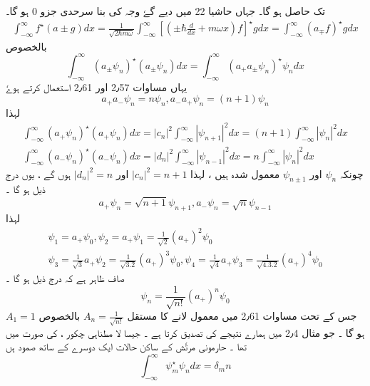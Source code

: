 تک حاصل ہو گا۔  جہاں حاشیا 22 میں دیے گےٗ  وجہ کی بنا سرحدی جزو 0 ہو گا۔
\begin{align}
\int_{ - \infty }^{ \infty } f^\star( a \pm g) dx = \frac{1}{ \sqrt{ 2 \hbar m \omega } } \int_{ - \infty }^{ \infty } [ ( \pm \hbar \frac{d}{dx} + m \omega x ) f]^\star g dx = \int_{ - \infty }^{ \infty } (a_\mp f )^\star g dx
\end{align}  
بالخصوص 
$$ \int_{ - \infty }^{ \infty } ( a_\pm \psi_n )^\star( a_\pm \psi_n ) dx = \int_{ - \infty }^{ \infty } ( a_+ a_\pm \psi_n )^\star \psi_n  dx $$
یہاں مساوات 2٫57 اور 2٫61 استعمال کرتے ہوےٗ 
\begin{equation}
a_+ a_-  \psi_n = n \psi_n , a_- a_+ \psi_n = ( n+1 ) \psi_n 
\end{equation}
لہذا 
\begin{align}
\int_{ - \infty }^{ \infty } ( a_+ \psi_n )^\star( a_+ \psi_n ) dx = | c_n |^2 \int_{ - \infty }^{ \infty } | \psi_{n+1} |^2  dx  = ( n+1 ) \int_{ - \infty }^{ \infty } | \psi_n |^2 dx
\\
\int_{ - \infty }^{ \infty } ( a_- \psi_n )^\star( a_- \psi_n ) dx = | d_n |^2 \int_{ - \infty }^{ \infty } | \psi_{n-1} |^2  dx  =  n \int_{ - \infty }^{ \infty } | \psi_n |^2 dx
\end{align}
چونکہ 
$ \psi_n $
اور 
$ \psi_{ n \pm 1 } $
معمول شدہ ہیں ، لہذا 
$ | c_n |^2 = n+1 $
اور
$ | d_n |^2 = n $
ہوں گے ، یوں درج ذیل ہو گا ۔
\begin{equation}
a_+ \psi_n = \sqrt{n+1} \psi_{n+1} , a_- \psi_n = \sqrt{n} \psi_{n-1}
\end{equation}
لہذا 
\begin{align}
\psi_1 = a_+ \psi_0 , \psi_2 = a_+ \psi_1 = \frac{1}{ \sqrt{ 2 } } (a_+)^2 \psi_0
\\
\psi_3 = \frac{ 1 }{ \sqrt{ 3 } } a_+ \psi_2 = \frac{ 1 }{ \sqrt{3 . 2} } ( a_+ )^3 \psi_0 ,  \psi_4 = \frac{1}{ \sqrt{4} } a_+ \psi_3 =\frac{1}{ \sqrt{4 . 3 . 2} } ( a_+)^4 \psi_0
\end{align}
صاف ظاہر ہے کہ درج ذیل ہو گا ۔ 
\begin{equation}
\psi_n = \frac{1}{ \sqrt{n!} } ( a_+ )^n \psi_0
\end{equation}
جس کے تحت مساوات 2٫61 میں معمول  لانے کا مستقل 
$ A_n = \frac{1}{ \sqrt{ n! } } $
بالخصوص 
$ A_1 = 1 $
ہو گا ۔ جو مثال 2٫4 میں ہمارے نتیجے کی تصدیق کرتا ہے ۔
\newpage 
جیسا لا مطناہی  چکور ، کی صورت میں تھا ۔ حارمونی مرتٗش کے ساکن حالات ایک دوسرے کے ساتھ  صمود ہں 
\begin{equation}
\int_{ - \infty }^{ \infty } \psi_m^\star\psi_n dx = \delta_mn
\end{equation}
